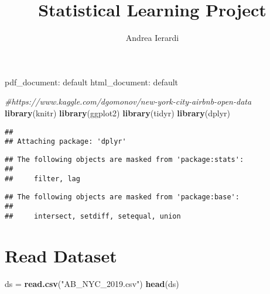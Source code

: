 \documentclass[
]{article}
\title{Statistical Learning Project}
\author{Andrea Ierardi}
\date{}
\newenvironment{Shaded}{\begin{snugshade}}{\end{snugshade}}
\newcommand{\CommentTok}[1]{\textcolor[rgb]{0.56,0.35,0.01}{\textit{#1}}}
\newcommand{\KeywordTok}[1]{\textcolor[rgb]{0.13,0.29,0.53}{\textbf{#1}}}
\newcommand{\NormalTok}[1]{#1}
\newcommand{\StringTok}[1]{\textcolor[rgb]{0.31,0.60,0.02}{#1}}
\begin{document}
\maketitle

pdf\_document: default html\_document: default

\begin{Shaded}
\begin{Highlighting}[]
\CommentTok{#https://www.kaggle.com/dgomonov/new-york-city-airbnb-open-data}
\KeywordTok{library}\NormalTok{(knitr)}
\KeywordTok{library}\NormalTok{(ggplot2)}
\KeywordTok{library}\NormalTok{(tidyr)}
\KeywordTok{library}\NormalTok{(dplyr)}
\end{Highlighting}
\end{Shaded}

\begin{verbatim}
## 
## Attaching package: 'dplyr'
\end{verbatim}

\begin{verbatim}
## The following objects are masked from 'package:stats':
## 
##     filter, lag
\end{verbatim}

\begin{verbatim}
## The following objects are masked from 'package:base':
## 
##     intersect, setdiff, setequal, union
\end{verbatim}

\hypertarget{read-dataset}{%
\section{Read Dataset}\label{read-dataset}}

\begin{Shaded}
\begin{Highlighting}[]
\NormalTok{ds =}\StringTok{ }\KeywordTok{read.csv}\NormalTok{(}\StringTok{"AB_NYC_2019.csv"}\NormalTok{)}
\KeywordTok{head}\NormalTok{(ds)}
\end{Highlighting}
\end{Shaded}
\end{document}
